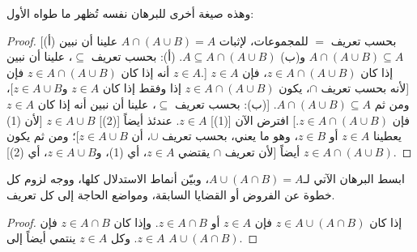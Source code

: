 \documentclass[../../../include/open-logic-section]{subfiles}
\begin{document}
وهذه صيغة أخرى للبرهان نفسه تُظهر ما طواه الأول:
\begin{proof}{}
[بحسب تعريف $=$ للمجموعات، لإثبات $A \cap (A \cup B) = A$ علينا أن
  نبين (أ) $A \cap (A \cup B) \subseteq A$ و(ب)
  $A \subseteq A \cap (A \cup B)$. (أ): بحسب تعريف $\subseteq$، علينا
  أن نبين أنه إذا كان $z \in A \cap (A \cup B)$ فإن $z \in A$.]
إذا كان $z \in A \cap (A \cup B)$، فإن $z \in A$ [لأنه بحسب تعريف
$\cap$، يكون $z \in A \cap (A \cup B)$ إذا وفقط إذا كان $z \in A$
و$z \in A \cup B$]، ومن ثم $A \cap (A \cup B) \subseteq A$.
[(ب): بحسب تعريف $\subseteq$، علينا أن نبين أنه إذا كان $z \in A$ فإن
$z \in A \cap (A \cup B)$.] افترض الآن [(1)] $z \in A$. عندئذ أيضاً
[(2)] $z \in A \cup B$ [لأن (1) يعطينا $z \in A$ أو $z \in B$،
وهو ما يعني، بحسب تعريف $\cup$، أن $z \in A \cup B$]؛ ومن ثم يكون
$z \in A \cap (A \cup B)$ أيضاً [لأن تعريف $\cap$ يقتضي
$z \in A$، أي (1)، و$z \in A \cup B$، أي (2)].
\end{proof}

\begin{prob}
ابسط البرهان الآتي لـ$A \cup (A \cap B) = A$، وبيّن أنماط الاستدلال
كلها، ووجه لزوم كل خطوة عن الفروض أو القضايا السابقة، ومواضع الحاجة
إلى كل تعريف.
\begin{proof}
  إذا كان $z \in A \cup (A \cap B)$ فإن $z \in A$ أو
  $z \in A \cap B$. وإذا كان $z \in A \cap B$ فإن $z \in A$. وكل
  $z \in A$ ينتمي أيضاً إلى $A \cup (A \cap B)$.
\end{proof}
\end{prob}
\end{document}
